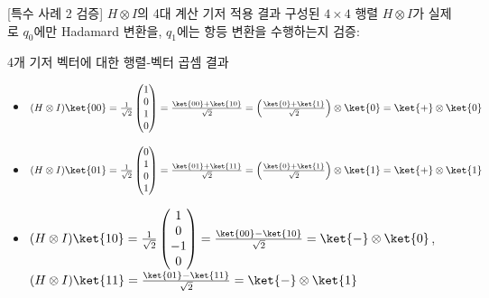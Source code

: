 \documentclass[aspectratio=169, 10pt]{beamer}
\begin{document}
\begin{frame}{[특수 사례 2 검증] $H \otimes I$의 4대 계산 기저 적용 결과}
    구성된 $4 \times 4$ 행렬 $H \otimes I$가 실제로 $q_0$에만 Hadamard 변환을, $q_1$에는 항등 변환을 수행하는지 검증:
    \vspace{0.15cm}
    \begin{qcblock}{4개 기저 벡터에 대한 행렬-벡터 곱셈 결과}
        \begin{itemize}
            \item $(H \otimes I)\ket{00} = \frac{1}{\sqrt{2}}\begin{pmatrix} 1 \\ 0 \\ 1 \\ 0 \end{pmatrix} = \frac{\ket{00}+\ket{10}}{\sqrt{2}} = \left(\frac{\ket{0}+\ket{1}}{\sqrt{2}}\right) \otimes \ket{0} = \ket{+} \otimes \ket{0}$
            \pause
            \item $(H \otimes I)\ket{01} = \frac{1}{\sqrt{2}}\begin{pmatrix} 0 \\ 1 \\ 0 \\ 1 \end{pmatrix} = \frac{\ket{01}+\ket{11}}{\sqrt{2}} = \left(\frac{\ket{0}+\ket{1}}{\sqrt{2}}\right) \otimes \ket{1} = \ket{+} \otimes \ket{1}$
            \pause
            \item $(H \otimes I)\ket{10} = \frac{1}{\sqrt{2}}\begin{pmatrix} 1 \\ 0 \\ -1 \\ 0 \end{pmatrix} = \frac{\ket{00}-\ket{10}}{\sqrt{2}} = \ket{-} \otimes \ket{0}$, \quad $(H \otimes I)\ket{11} = \frac{\ket{01}-\ket{11}}{\sqrt{2}} = \ket{-} \otimes \ket{1}$
        \end{itemize}
    \end{qcblock}
\end{frame}
\end{document}

